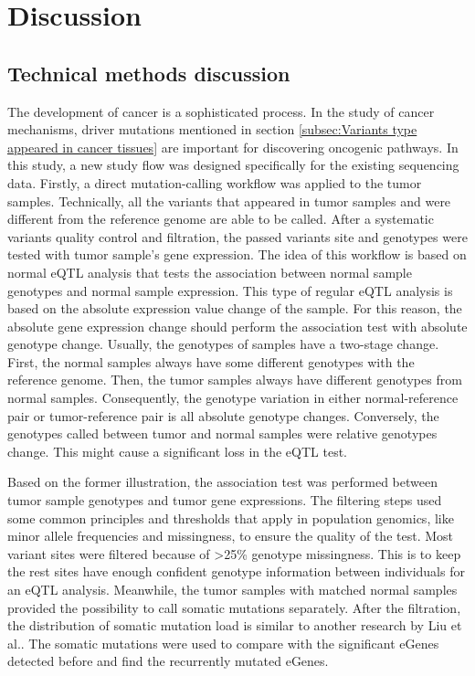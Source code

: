 \chapter{Discussion}

\section{Technical methods discussion}

The development of cancer is a sophisticated process. In the study of cancer mechanisms, driver mutations mentioned in section \ref{subsec:Variants type appeared in cancer tissues} are important for discovering oncogenic pathways. In this study, a new study flow was designed specifically for the existing sequencing data. Firstly, a direct mutation-calling workflow was applied to the tumor samples. Technically, all the variants that appeared in tumor samples and were different from the reference genome are able to be called. After a systematic variants quality control and filtration, the passed variants site and genotypes were tested with tumor sample's gene expression. The idea of this workflow is based on normal eQTL analysis that tests the association between normal sample genotypes and normal sample expression. This type of regular eQTL analysis is based on the absolute expression value change of the sample. For this reason, the absolute gene expression change should perform the association test with absolute genotype change. Usually, the genotypes of samples have a two-stage change. First, the normal samples always have some different genotypes with the reference genome. Then, the tumor samples always have different genotypes from normal samples. Consequently, the genotype variation in either normal-reference pair or tumor-reference pair is all absolute genotype changes. Conversely, the genotypes called between tumor and normal samples were relative genotypes change. This might cause a significant loss in the eQTL test. 

Based on the former illustration, the association test was performed between tumor sample genotypes and tumor gene expressions. The filtering steps used some common principles and thresholds that apply in population genomics, like minor allele frequencies and missingness, to ensure the quality of the test. Most variant sites were filtered because of >25\% genotype missingness. This is to keep the rest sites have enough confident genotype information between individuals for an eQTL analysis. Meanwhile, the tumor samples with matched normal samples provided the possibility to call somatic mutations separately. After the filtration, the distribution of somatic mutation load is similar to another research by Liu et al.\cite{liu_association_2018}. The somatic mutations were used to compare with the significant eGenes detected before and find the recurrently mutated eGenes.

